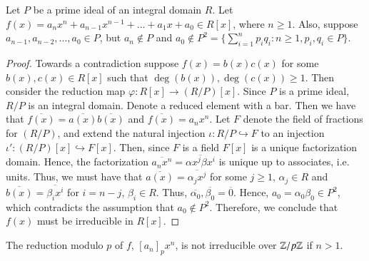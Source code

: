 \documentclass[12pt, a4paper, oneside, openright, titlepage]{book}
\begin{document}
\begin{namthm} \label{namthm:eisgen}
    Let $P$ be a prime ideal of an integral domain $R$. Let $f(x) = a_nx^n + a_{n-1}x^{n-1}+...+a_1x+a_0 \in R[x]$, where $n \geq 1$. Also, suppose $a_{n-1},a_{n-2},...,a_0 \in P$, but $a_n \notin P$ and $a_0 \notin P^2 = \{\sum_{i=1}^np_iq_i:n \geq 1,p_i,q_i \in P\}$.
\end{namthm}
\begin{proof}
    Towards a contradiction suppose $f(x) = b(x)c(x)$ for some $b(x),c(x) \in R[x]$ such that $\deg(b(x)),\deg(c(x)) \geq 1$. Then consider the reduction map $\varphi:R[x]\rightarrow (R/P)[x]$. Since $P$ is a prime ideal, $R/P$ is an integral domain. Denote a reduced element with a bar. Then we have that $\overline{f(x)} = \overline{a(x)}\overline{b(x)}$ and $\overline{f(x)} = a_nx^n$. Let $F$ denote the field of fractions for $(R/P)$, and extend the natural injection $\iota:R/P\hookrightarrow F$ to an injection $\iota':(R/P)[x]\hookrightarrow F[x]$. Then, since $F$ is a field $F[x]$ is a unique factorization domain. Hence, the factorization $\overline{a_nx^n} = \overline{\alpha x^j\beta x^i}$ is unique up to associates, i.e. units. Thus, we must have that $\overline{a(x)} = \overline{\alpha_j x^j}$ for some $j \geq 1$, $\alpha_j \in R$ and $\overline{b(x)} = \overline{\beta_i x^i}$ for $i = n-j$, $\beta_i \in R$. Thus, $\overline{\alpha_0},\overline{\beta_0} = \overline{0}$. Hence, $a_0 = \alpha_0\beta_0 \in P^2$, which contradicts the assumption that $a_0 \notin P^2$. Therefore, we conclude that $f(x)$ must be irreducible in $R[x]$.
\end{proof}




\begin{note}
    The reduction modulo $p$ of $f$, $[a_n]_px^n$, is not irreducible over $\mathbb Z/p\mathbb Z$ if $n > 1$.
\end{note}
\end{document}
